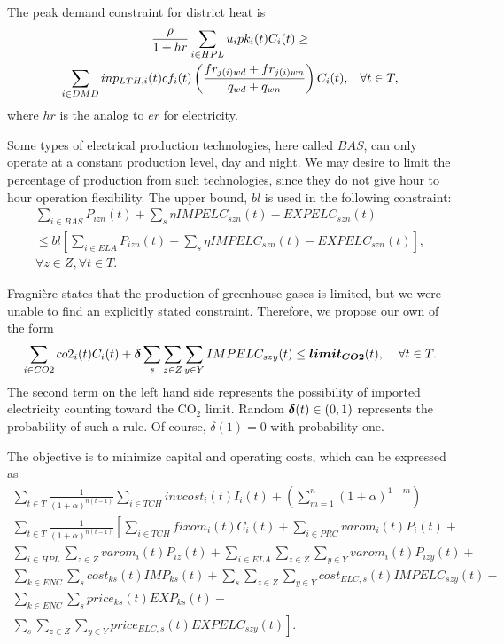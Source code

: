 The peak demand constraint for district heat is
\begin{multline*}
\frac{\rho}{1 + hr} \sum_{i\in HPL} u_i pk_i(t) C_i(t) \geq \\
\sum_{i\in DMD}  inp_{LTH,i}(t) cf_i(t) \left( \frac{fr_{j(i) w d} + fr_{j(i) w n}}{q_{wd} + q_{wn}}\right) C_i(t), \hspace{3mm} \forall t\in T,
\end{multline*}
where $hr$ is the analog to $er$ for electricity.

Some types of electrical production technologies, here called $BAS$, can only operate at a constant production level, day and night.  We may desire to limit the percentage of production from such technologies, since they do not give hour to hour operation flexibility.  The upper bound, $bl$ is used in the following constraint:
\begin{multline*}
\sum_{i\in BAS} P_{izn}(t) + \sum_s \eta IMPELC_{szn}(t) - EXPELC_{szn}(t) \\
\leq bl\left[ \sum_{i\in ELA} P_{izn}(t) + \sum_s \eta IMPELC_{szn}(t) - EXPELC_{szn}(t) \right],\\
\forall z \in Z, \forall t\in T.
\end{multline*}

Fragni\`{e}re \cite{fragniere95} states that the production of greenhouse gases is limited, but we were unable to find an explicitly stated constraint.  Therefore, we propose our own of the form
\begin{equation}
\label{ENV:co2limit}
\sum_{i\in CO2} co2_i(t) C_i(t) + \mathbf{\boldsymbol{\delta}} \sum_s \sum_{z\in Z} \sum_{y\in Y}IMPELC_{szy}(t)\leq \mathbf{\boldsymbol{limit_{CO2}}}(t), \hspace{0.4cm} \forall t\in T.
\end{equation}
The second term on the left hand side represents the possibility of imported electricity counting toward the $\text{CO}_2$ limit.  Random $\mathbf{\boldsymbol{\delta}}(t)\in (0,1)$ represents the probability of such a rule.  Of course, $\delta(1)=0$ with probability one.

The objective is to minimize capital and operating costs, which can be expressed as
\begin{multline*}
\sum_{t\in T} \frac{1}{(1+\alpha)^{n(t-1)}} \sum_{i\in TCH} invcost_i(t) I_i(t) + \left(\sum_{m=1}^n (1+\alpha)^{1-m}\right) \\
\sum_{t\in T} \frac{1}{(1+\alpha)^{n(t-1)}} \left[ \sum_{i\in TCH} fixom_i(t)C_i(t) + \sum_{i\in PRC} varom_i(t)P_i(t) + \right.\\
\sum_{i\in HPL} \sum_{z\in Z} varom_i(t) P_{iz}(t) + \sum_{i\in ELA} \sum_{z\in Z} \sum_{y \in Y} varom_i(t) P_{izy}(t) + \\
\sum_{k\in ENC} \sum_{s} cost_{ks}(t) IMP_{ks}(t) + \sum_s \sum_{z\in Z} \sum_{y\in Y} cost_{ELC,s}(t) IMPELC_{szy}(t) -\\
 \sum_{k\in ENC} \sum_{s} price_{ks}(t) EXP_{ks}(t) -\\
\left. \sum_s \sum_{z\in Z} \sum_{y \in Y} price_{ELC,s}(t) EXPELC_{szy}(t) \right].
\end{multline*}

